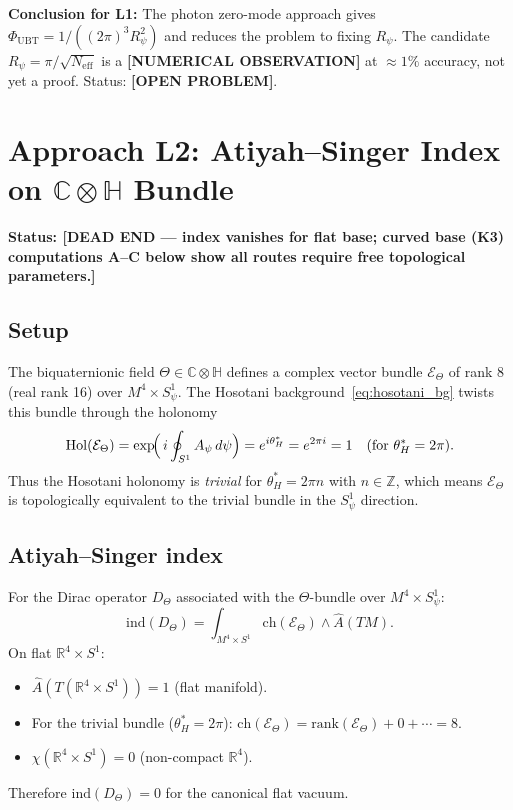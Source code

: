 \documentclass[11pt,a4paper]{article}
\theoremstyle{definition}
\theoremstyle{remark}
\begin{document}
\textbf{Conclusion for L1:}
The photon zero-mode approach gives $\Phi_{\mathrm{UBT}} = 1/((2\pi)^3 R_\psi^2)$
and reduces the problem to fixing $R_\psi$.
The candidate $R_\psi = \pi/\sqrt{N_{\mathrm{eff}}}$ is a
\textbf{[NUMERICAL OBSERVATION]} at $\approx 1\%$ accuracy,
not yet a proof.
Status: \textbf{[OPEN PROBLEM]}.

\section{Approach L2: Atiyah--Singer Index on $\mathbb{C}\otimes\mathbb{H}$ Bundle}
\label{sec:L2_AS}

\textbf{Status: [DEAD END — index vanishes for flat base; curved base (K3)
computations A--C below show all routes require free topological parameters.]}

\subsection{Setup}

The biquaternionic field $\Theta \in \mathbb{C}\otimes\mathbb{H}$ defines
a complex vector bundle $\mathcal{E}_\Theta$ of rank $8$ (real rank 16)
over $M^4 \times S^1_\psi$.
The Hosotani background~\eqref{eq:hosotani_bg} twists this bundle through
the holonomy
\begin{equation}
  \mathrm{Hol}(\mathcal{E}_\Theta)
  = \exp\!\Bigl(\,i\oint_{S^1}A_\psi\,d\psi\Bigr)
  = e^{i\theta_H^*}
  = e^{2\pi i} = 1
  \quad(\text{for } \theta_H^* = 2\pi).
\end{equation}
Thus the Hosotani holonomy is \emph{trivial} for $\theta_H^* = 2\pi n$ with
$n\in\mathbb{Z}$, which means $\mathcal{E}_\Theta$ is topologically
equivalent to the trivial bundle in the $S^1_\psi$ direction.

\subsection{Atiyah--Singer index}

For the Dirac operator $D_\Theta$ associated with the $\Theta$-bundle
over $M^4\times S^1_\psi$:
\begin{equation}
  \mathrm{ind}(D_\Theta)
  = \int_{M^4\times S^1} \mathrm{ch}(\mathcal{E}_\Theta)\wedge\hat{A}(TM).
\end{equation}
On flat $\mathbb{R}^4\times S^1$:
\begin{itemize}
  \item $\hat{A}(T(\mathbb{R}^4\times S^1)) = 1$ (flat manifold).
  \item For the trivial bundle ($\theta_H^* = 2\pi$):
    $\mathrm{ch}(\mathcal{E}_\Theta) = \mathrm{rank}(\mathcal{E}_\Theta)
    + 0 + \cdots = 8$.
  \item $\chi(\mathbb{R}^4\times S^1) = 0$ (non-compact $\mathbb{R}^4$).
\end{itemize}
Therefore $\mathrm{ind}(D_\Theta) = 0$ for the canonical flat vacuum.
\end{document}
